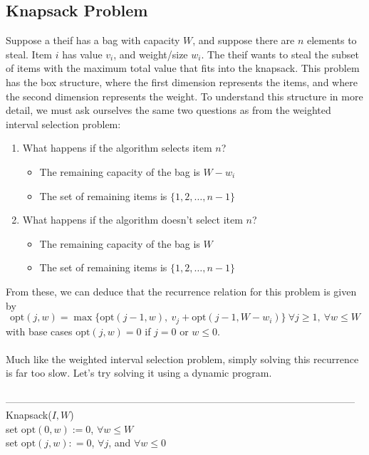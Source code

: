 \documentclass{article}
\newcommand{\opt}{\text{opt}}
\begin{document}
\subsection{Knapsack Problem}
Suppose a theif has a bag with capacity $W$, and suppose there are $n$ elements to steal. Item $i$ has value $v_i$, and weight/size $w_i$. The theif wants to steal the subset of items with the maximum total value that fits into the knapsack. This problem has the box structure, where the first dimension represents the items, and where the second dimension represents the weight. To understand this structure in more detail, we must ask ourselves the same two questions as from the weighted interval selection problem:
\begin{enumerate}
	\item What happens if the algorithm selects item $n$?
	\begin{itemize}
		\item The remaining capacity of the bag is $W - w_i$
		\item The set of remaining items is $\{1, 2, \dots, n-1\}$
	\end{itemize}
	\item What happens if the algorithm doesn't select item $n$?
	\begin{itemize}
		\item The remaining capacity of the bag is $W$
		\item The set of remaining items is $\{1, 2, \dots, n-1\}$
	\end{itemize}
\end{enumerate}
From these, we can deduce that the recurrence relation for this problem is given by
\[\opt(j, w) = \max\{\opt(j-1, w),\ v_j + \opt(j-1, W-w_i)\}\ \forall j \geq 1,\ \forall w \leq W\]
with base cases $\opt(j, w) = 0$ if $j=0$ or $w \leq 0$.\\\\
Much like the weighted interval selection problem, simply solving this recurrence is far too slow. Let's try solving it using a dynamic program.\\\\
---------------------------------------------------------------------------------------------------------
Knapsack($I, W$)\\
	\hspace*{7mm} set $\opt(0, w) := 0$, $\forall w \leq W$\\
	\hspace*{7mm} set $\opt(j, w) : = 0$, $\forall j$, and $\forall w \leq 0$\\
\end{document}
